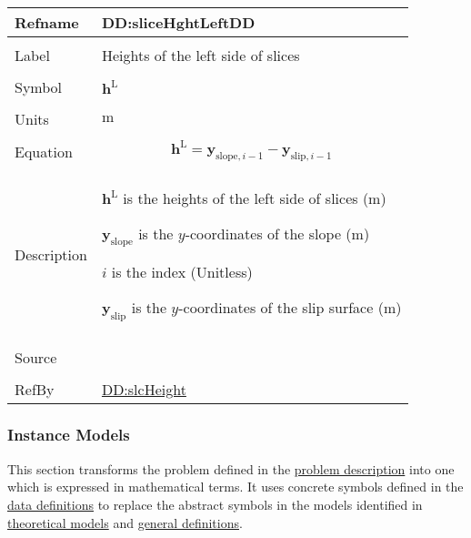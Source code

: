 \documentclass[12pt]{article}
\begin{document}
\vspace{\baselineskip}
\noindent
\begin{minipage}{\textwidth}
\begin{tabular}{>{\raggedright}p{}>{\raggedright\arraybackslash}p{}}
\toprule \textbf{Refname} & \textbf{DD:sliceHghtLeftDD}
\label{DD:sliceHghtLeftDD}
\\ \midrule \\
Label & Heights of the left side of slices
        
\\ \midrule \\
Symbol & ${\symbf{h}^{\text{L}}}$
         
\\ \midrule \\
Units & ${\text{m}}$
        
\\ \midrule \\
Equation & \begin{displaymath}
           {\symbf{h}^{\text{L}}}={\symbf{y}_{\text{slope},i-1}}-{\symbf{y}_{\text{slip},i-1}}
           \end{displaymath}
\\ \midrule \\
Description & \begin{symbDescription}
              \item{${\symbf{h}^{\text{L}}}$ is the heights of the left side of slices (${\text{m}}$)}
              \item{${\symbf{y}_{\text{slope}}}$ is the $y$-coordinates of the slope (${\text{m}}$)}
              \item{$i$ is the index (Unitless)}
              \item{${\symbf{y}_{\text{slip}}}$ is the $y$-coordinates of the slip surface (${\text{m}}$)}
              \end{symbDescription}
\\ \midrule \\
Source & \cite{fredlund1977}
         
\\ \midrule \\
RefBy & \hyperref[DD:slcHeight]{DD:slcHeight}
        
\\ \bottomrule
\end{tabular}
\end{minipage}

\subsubsection{Instance Models}
\label{Sec:IMs}
This section transforms the problem defined in the \hyperref[Sec:ProbDesc]{problem description} into one which is expressed in mathematical terms. It uses concrete symbols defined in the \hyperref[Sec:DDs]{data definitions} to replace the abstract symbols in the models identified in \hyperref[Sec:TMs]{theoretical models} and \hyperref[Sec:GDs]{general definitions}.
\end{document}
